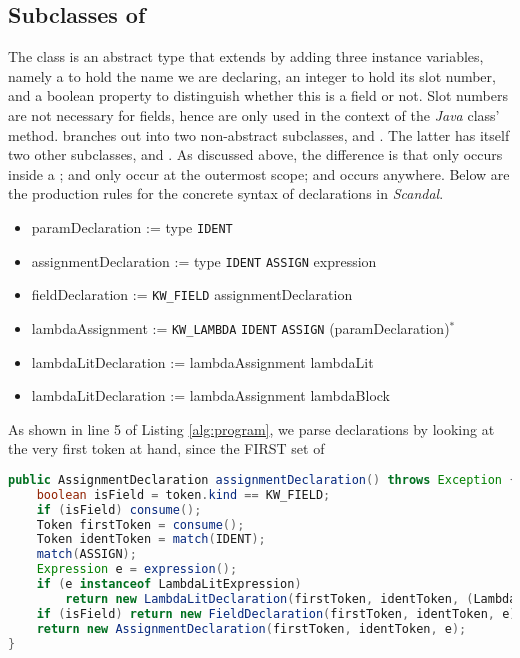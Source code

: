 \subsection{Subclasses of }

The class  is an abstract type that extends  by adding three instance variables, namely a  to hold the name we are declaring, an integer to hold its slot number, and a boolean property to distinguish whether this is a field or not. Slot numbers are not necessary for fields, hence are only used in the context of the \emph{Java} class'  method.  branches out into two non-abstract subclasses,  and . The latter has itself two other subclasses,  and . As discussed above, the difference is that  only occurs inside a ;  and  only occur at the outermost scope; and  occurs anywhere. Below are the production rules for the concrete syntax of declarations in \emph{Scandal}.

\begin{itemize}
	\item paramDeclaration := type \texttt{IDENT}
	\item assignmentDeclaration := type \texttt{IDENT} \texttt{ASSIGN} expression
	\item fieldDeclaration := \texttt{KW\_FIELD} assignmentDeclaration
	\item lambdaAssignment := \texttt{KW\_LAMBDA} \texttt{IDENT} \texttt{ASSIGN} (paramDeclaration)$^*$
	\item lambdaLitDeclaration := lambdaAssignment lambdaLit
	\item lambdaLitDeclaration := lambdaAssignment lambdaBlock
\end{itemize}

As shown in line 5 of Listing \ref{alg:program}, we parse declarations by looking at the very first token at hand, since the FIRST set of 




\begin{lstlisting}[language=Java,caption={},label={alg:assign}]
public AssignmentDeclaration assignmentDeclaration() throws Exception {
	boolean isField = token.kind == KW_FIELD;
	if (isField) consume();
	Token firstToken = consume();
	Token identToken = match(IDENT);
	match(ASSIGN);
	Expression e = expression();
	if (e instanceof LambdaLitExpression)
		return new LambdaLitDeclaration(firstToken, identToken, (LambdaLitExpression) e);
	if (isField) return new FieldDeclaration(firstToken, identToken, e);
	return new AssignmentDeclaration(firstToken, identToken, e);
}
\end{lstlisting}

